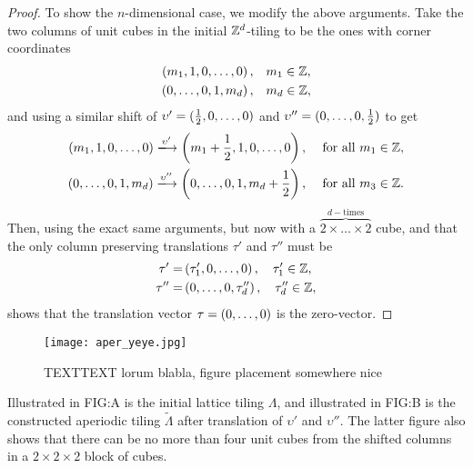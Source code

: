 \documentclass[../thesis.tex]{subfiles}
\begin{document}
\begin{proof}
To show the $n$-dimensional case, we modify the above arguments. Take the two columns of unit cubes in the initial $\mathbb{Z}^d$-tiling to be the ones with corner coordinates
\begin{align*}
    \left(m_1,1,0, \dots,0\right), & \quad m_1 \in \mathbb{Z},\\
    \left(0,\dots,0,1,m_d\right),& \quad m_d \in \mathbb{Z},
\end{align*}
and using a similar shift of $\upsilon' = (\frac{1}{2},0,\dots,0)$ and $\upsilon'' = (0,\dots,0,\frac{1}{2})$ to get
\begin{align*}
    \bracMed{m_1,1,0, \dots,0} \xlongrightarrow[]{\upsilon'} \bracMed{m_1+\frac{1}{2}, 1, 0, \dots, 0}, \quad  &\text{ for all } m_1 \in \Z,\\
    \bracMed{0,\dots,0,1,m_d} \xlongrightarrow[]{\upsilon''} \bracMed{0, \dots, 0, 1, m_d+\frac{1}{2}},    \quad  &\text{ for all }  m_3 \in \Z.
\end{align*}
Then, using the exact same arguments, but now with a $\overbrace{2\times \dots \times 2}^{d-\text{times}}$ cube, and that the only column preserving translations $\tau'$ and $\tau''$ must be
\begin{align*}
    \tau' =& \left(\tau'_1,0,\dots,0 \right), \quad \tau'_1 \in \mathbb{Z},\\
    \tau'' =& \left(0,\dots,0,\tau''_d\right), \quad \tau''_d \in \mathbb{Z},
\end{align*}
shows that the translation vector $\tau=(0,\dots,0)$ is the zero-vector.
\end{proof}

\begin{figure*}[h!]
    \centering
    \texttt{[image: aper\_yeye.jpg]}
    \caption{TEXTTEXT lorum blabla, figure placement somewhere nice}
    \label{fig:aperi_cube}
\end{figure*}

Illustrated in FIG:A is the initial lattice tiling $\Lambda$, and illustrated in FIG:B is the constructed aperiodic tiling $\widetilde{\Lambda}$ after translation of $\upsilon'$ and $\upsilon''$. The latter figure also shows that there can be no more than four unit cubes from the shifted columns in a $2\times 2\times 2$ block of cubes. 
\end{document}
